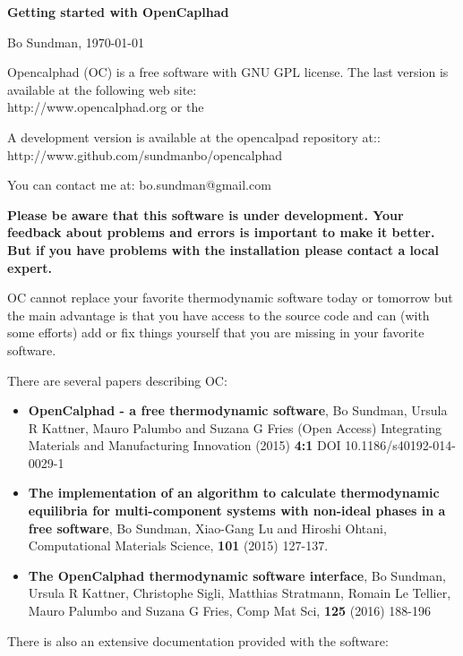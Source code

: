 \documentclass[12pt]{article}
\begin{document}
\begin{center}
{\Large \bf Getting started with OpenCaplhad}

Bo Sundman, \today

Opencalphad (OC) is a free software with GNU GPL license.  The last
version is available at the following web site:\\
http://www.opencalphad.org or the

A development version is available at the opencalpad repository at::\\
http://www.github.com/sundmanbo/opencalphad

You can contact me at: bo.sundman@gmail.com
\end{center}

{\large \bf Please be aware that this software is under development.
  Your feedback about problems and errors is important to make it
  better.  But if you have problems with the installation please
  contact a local expert.}

OC cannot replace your favorite thermodynamic software today or
tomorrow but the main advantage is that you have access to the source
code and can (with some efforts) add or fix things yourself that you
are missing in your favorite software.

There are several papers describing OC:

\begin{itemize}
\item {\bf OpenCalphad - a free thermodynamic software}, Bo Sundman,
  Ursula R Kattner, Mauro Palumbo and Suzana G Fries (Open Access)
  Integrating Materials and Manufacturing Innovation (2015) {\bf 4:1}
  DOI 10.1186/s40192-014-0029-1

\item {\bf The implementation of an algorithm to calculate
  thermodynamic equilibria for multi-component systems with non-ideal
  phases in a free software}, Bo Sundman, Xiao-Gang Lu and Hiroshi
  Ohtani, Computational Materials Science, {\bf 101} (2015) 127-137.

\item {\bf The OpenCalphad thermodynamic software interface}, Bo
  Sundman, Ursula R Kattner, Christophe Sigli, Matthias Stratmann,
  Romain Le Tellier, Mauro Palumbo and Suzana G Fries, Comp Mat Sci,
  {\bf 125} (2016) 188-196
\end{itemize}


There is also an extensive documentation provided with the software:
\end{document}
